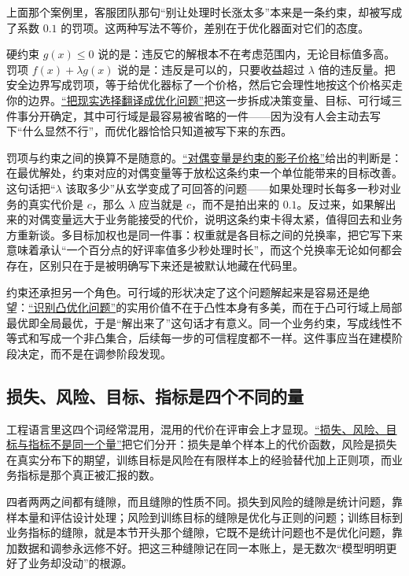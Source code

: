 上面那个案例里，客服团队那句``别让处理时长涨太多''本来是一条约束，却被写成了系数 \(0.1\) 的罚项。这两种写法不等价，差别在于优化器面对它们的态度。

硬约束 \(g(x)\le 0\) 说的是：违反它的解根本不在考虑范围内，无论目标值多高。罚项 \(f(x)+\lambda g(x)\) 说的是：违反是可以的，只要收益超过 \(\lambda\) 倍的违反量。把安全边界写成罚项，等于给优化器标了一个价格，然后它会理性地按这个价格买走你的边界。\hyperref[sec:09-Convex-Optimization/01-Optimization-Foundations/01]{``把现实选择翻译成优化问题''}把这一步拆成决策变量、目标、可行域三件事分开确定，其中可行域是最容易被省略的一件——因为没有人会主动去写下``什么显然不行''，而优化器恰恰只知道被写下来的东西。

罚项与约束之间的换算不是随意的。\hyperref[sec:09-Convex-Optimization/05-Duality/04]{``对偶变量是约束的影子价格''}给出的判断是：在最优解处，约束对应的对偶变量等于放松这条约束一个单位能带来的目标改善。这句话把``\(\lambda\) 该取多少''从玄学变成了可回答的问题——如果处理时长每多一秒对业务的真实代价是 \(c\)，那么 \(\lambda\) 应当就是 \(c\)，而不是拍出来的 \(0.1\)。反过来，如果解出来的对偶变量远大于业务能接受的代价，说明这条约束卡得太紧，值得回去和业务方重新谈。多目标加权也是同一件事：权重就是各目标之间的兑换率，把它写下来意味着承认``一个百分点的好评率值多少秒处理时长''，而这个兑换率无论如何都会存在，区别只在于是被明确写下来还是被默认地藏在代码里。

约束还承担另一个角色。可行域的形状决定了这个问题解起来是容易还是绝望：\hyperref[ch:074]{``识别凸优化问题''}的实用价值不在于凸性本身有多美，而在于凸可行域上局部最优即全局最优，于是``解出来了''这句话才有意义。同一个业务约束，写成线性不等式和写成一个非凸集合，后续每一步的可信程度都不一样。这件事应当在建模阶段决定，而不是在调参阶段发现。

\subsection{损失、风险、目标、指标是四个不同的量}

工程语言里这四个词经常混用，混用的代价在评审会上才显现。\hyperref[sec:13-Machine-Learning/01-Learning-Problems-and-Evaluation/02]{``损失、风险、目标与指标不是同一个量''}把它们分开：损失是单个样本上的代价函数，风险是损失在真实分布下的期望，训练目标是风险在有限样本上的经验替代加上正则项，而业务指标是那个真正被汇报的数。

四者两两之间都有缝隙，而且缝隙的性质不同。损失到风险的缝隙是统计问题，靠样本量和评估设计处理；风险到训练目标的缝隙是优化与正则的问题；训练目标到业务指标的缝隙，就是本节开头那个缝隙，它既不是统计问题也不是优化问题，靠加数据和调参永远修不好。把这三种缝隙记在同一本账上，是无数次``模型明明更好了业务却没动''的根源。


